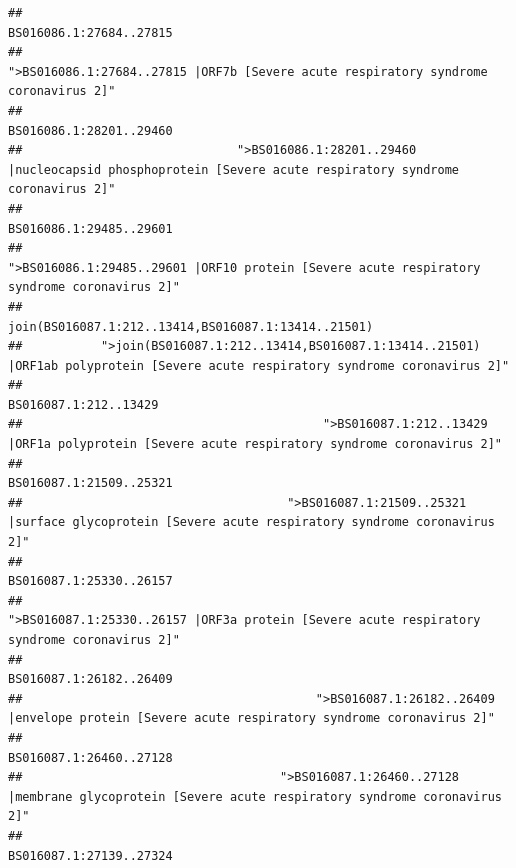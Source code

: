 \documentclass[
]{article}
\begin{document}
\begin{verbatim}
##                                                                                                                BS016086.1:27684..27815 
##                                                    ">BS016086.1:27684..27815 |ORF7b [Severe acute respiratory syndrome coronavirus 2]" 
##                                                                                                                BS016086.1:28201..29460 
##                              ">BS016086.1:28201..29460 |nucleocapsid phosphoprotein [Severe acute respiratory syndrome coronavirus 2]" 
##                                                                                                                BS016086.1:29485..29601 
##                                            ">BS016086.1:29485..29601 |ORF10 protein [Severe acute respiratory syndrome coronavirus 2]" 
##                                                                                    join(BS016087.1:212..13414,BS016087.1:13414..21501) 
##           ">join(BS016087.1:212..13414,BS016087.1:13414..21501) |ORF1ab polyprotein [Severe acute respiratory syndrome coronavirus 2]" 
##                                                                                                                  BS016087.1:212..13429 
##                                          ">BS016087.1:212..13429 |ORF1a polyprotein [Severe acute respiratory syndrome coronavirus 2]" 
##                                                                                                                BS016087.1:21509..25321 
##                                     ">BS016087.1:21509..25321 |surface glycoprotein [Severe acute respiratory syndrome coronavirus 2]" 
##                                                                                                                BS016087.1:25330..26157 
##                                            ">BS016087.1:25330..26157 |ORF3a protein [Severe acute respiratory syndrome coronavirus 2]" 
##                                                                                                                BS016087.1:26182..26409 
##                                         ">BS016087.1:26182..26409 |envelope protein [Severe acute respiratory syndrome coronavirus 2]" 
##                                                                                                                BS016087.1:26460..27128 
##                                    ">BS016087.1:26460..27128 |membrane glycoprotein [Severe acute respiratory syndrome coronavirus 2]" 
##                                                                                                                BS016087.1:27139..27324 

\end{verbatim}
\end{document}

